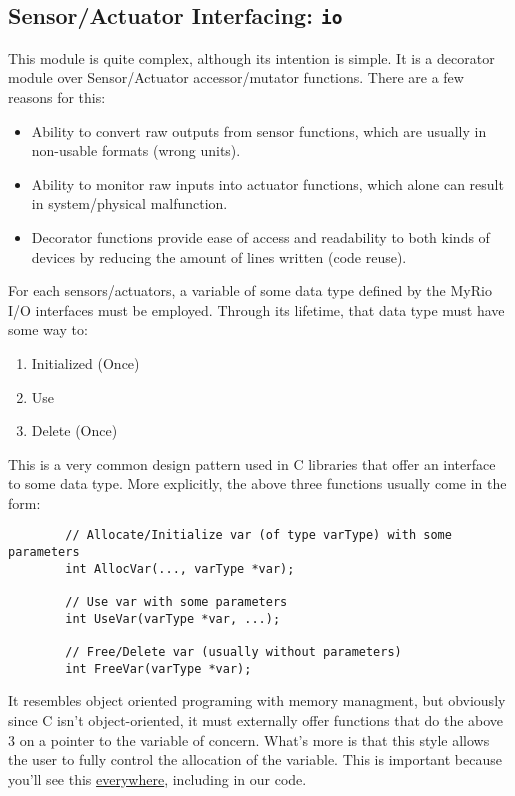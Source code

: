 \documentclass[letterpaper]{article}
\begin{document}
\newpage

\subsection{Sensor/Actuator Interfacing: \texttt{io}} \label{subsection-io}
This module is quite complex, although its intention is simple. It is a decorator module over Sensor/Actuator accessor/mutator functions. There are a few reasons for this:
\begin{itemize}
    \item Ability to convert raw outputs from sensor functions, which are usually in non-usable formats (wrong units).
    \item Ability to monitor raw inputs into actuator functions, which alone can result in system/physical malfunction.
    \item Decorator functions provide ease of access and readability to both kinds of devices by reducing the amount of lines written (code reuse).
\end{itemize}
For each sensors/actuators, a variable of some data type defined by the MyRio I/O interfaces must be employed. Through its lifetime, that data type must have some way to:
\begin{enumerate}
    \item Initialized (Once)
    \item Use
    \item Delete (Once)
\end{enumerate}
\begin{tcolorbox}[colback=yellow!10, colframe=green!20!black!70, title=C-Style Usage]
    This is a very common design pattern used in C libraries that offer an interface to some data type. More explicitly, the above three functions usually come in the form:
    \begin{lstlisting}
        // Allocate/Initialize var (of type varType) with some parameters
        int AllocVar(..., varType *var);
        
        // Use var with some parameters
        int UseVar(varType *var, ...);
        
        // Free/Delete var (usually without parameters)
        int FreeVar(varType *var);
    \end{lstlisting}
    It resembles object oriented programing with memory managment, but obviously since C isn't object-oriented, it must externally offer functions that do the above 3 on a pointer to the variable of concern. What's more is that this style allows the user to fully control the allocation of the variable. This is important because you'll see this \underline{everywhere}, including in our code.
\end{tcolorbox}
\end{document}
